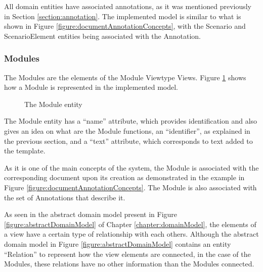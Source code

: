 \documentclass{llncs}
\begin{document}
All domain entities have associated annotations, as it was mentioned previously in Section \ref{section:annotation}. The implemented model is similar to what is shown in Figure \ref{figure:documentAnnotationConcepts}, with the Scenario and ScenarioElement entities being associated with the Annotation.


\subsubsection{Modules}
\label{subsection:modules}

The Modules are the elements of the Module Viewtype Views. Figure \ref{figure:modelModule} shows how a Module is represented in the implemented model.

\begin{figure}
\centering
\renewcommand {\umltextcolor}{black}
\renewcommand {\umlfillcolor}{none}
\renewcommand {\umldrawcolor}{black}

\caption{The Module entity}
\label{figure:modelModule}
\end{figure}

The Module entity has a ``name'' attribute, which provides identification and also gives an idea on what are the Module functions, an ``identifier'', as explained in the previous section, and a ``text'' attribute, which corresponds to text added to the template.

As it is one of the main concepts of the system, the Module is associated with the corresponding document upon its creation as demonstrated in the example in Figure \ref{figure:documentAnnotationConcepts}. The Module is also associated with the set of Annotations that describe it.

As seen in the abstract domain model present in Figure \ref{figure:abstractDomainModel} of Chapter \ref{chapter:domainModel}, the elements of a view have a certain type of relationship with each others. Although the abstract domain model in Figure \ref{figure:abstractDomainModel} contains an entity ``Relation'' to represent how the view elements are connected, in the case of the Modules, these relations have no other information than the Modules connected. 
\end{document}
